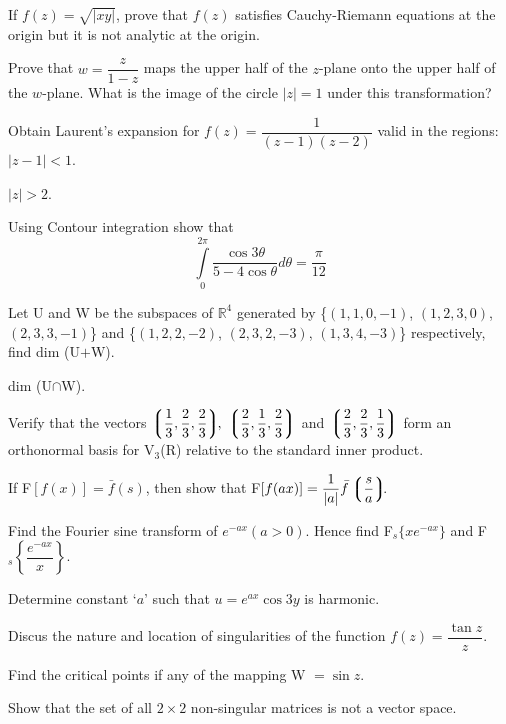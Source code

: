 \markB

\newpage \again

\partC

\item \iitem If $f(z) = \sqrt{|xy|}$, prove that $f(z)$ satisfies Cauchy-Riemann
  equations at the origin but it is not analytic at the origin.
\Or
\item Prove that $w = \dfrac{z}{1 - z}$ maps the upper half of the $z$-plane
  onto the upper half of the $w$-plane. What is the image of the circle
  $|z| = 1$ under this transformation?
\ene

\item \iitem Obtain Laurent's expansion for $f(z) = \dfrac{1}{(z - 1)(z - 2)}$
  valid in the regions:
\iitem $|z - 1| < 1$.
\item $|z| > 2$. \ene
\Or
\item Using Contour integration show that
\[ \int\limits_0^{2\pi} \dfrac{\cos 3\theta}{5 - 4\cos\theta} d\theta = \dfrac{\pi}{12}\]
\ene

\item \iitem Let U and W be the subspaces of $\mathbb{R}^4$ generated by \{$(1, 1, 0,
  -1)$, $(1, 2, 3, 0)$, $(2, 3, 3, -1)$\} and \{$(1, 2, 2, -2)$, $(2, 3, 2, -3)$,
  $(1, 3, 4, -3)$\} respectively, find
\iitem dim (U$+$W). \item dim (U$\cap$W).\ene
\Or
\item Verify that the vectors $\left\lgroup\dfrac{1}{3}, \dfrac{2}{3},
  \dfrac{2}{3}\right\rgroup\!\!,$ $\left\lgroup\dfrac{2}{3}, \dfrac{1}{3},
  \dfrac{2}{3}\right\rgroup$ and $\left\lgroup\dfrac{2}{3}, \dfrac{2}{3},
  \dfrac{1}{3}\right\rgroup$ form an orthonormal basis for V$_3$(R) relative to the
  standard inner product.
\ene

\item \iitem If F$[f(x)] = \bar{f}(s)$, then show that F$[f(ax)] = \dfrac {1}{|a|}
  \bar{f}\left\lgroup\dfrac{s}{a}\right\rgroup\!\!$.
\Or
\item Find the Fourier sine transform of $e^{-ax} (a>0)$. Hence find F$_s\{
  xe^{-ax}\}$ and F$_s\left\{\dfrac{e^{-ax}}{x}\right\}$.
\ene

\markC
\ene

\newpage

\sub{\subj}
\maxtime

\partA

\iitem Determine constant `$a$' such that $u = e^{ax}\cos 3y$ is harmonic.
\item Discus the nature and location of singularities of the function
  $f(z) = \dfrac{\tan z}{z}$.
\item Find the critical points if any of the mapping W $= \sin z$.
\item Show that the set of all $2 \times 2$ non-singular matrices is not
  a vector space.


